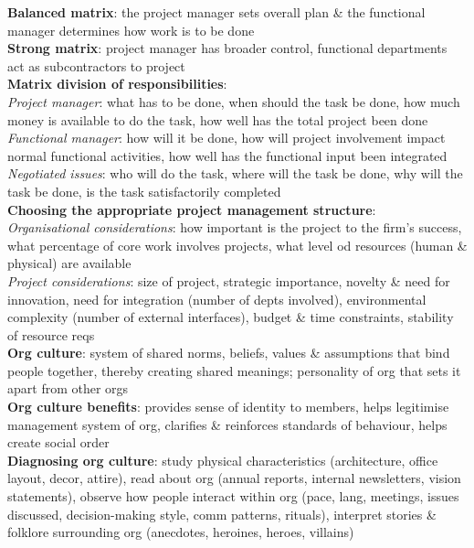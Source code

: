 \documentclass[a4paper]{article}
\begin{document}
\begin{multicols}{3}
        \textbf{Balanced matrix}: the project manager sets overall plan \& the functional manager determines how work is to be done\\
        \textbf{Strong matrix}: project manager has broader control, functional departments act as subcontractors to project\\
        \textbf{Matrix division of responsibilities}:\\
        \textit{Project manager}: what has to be done, when should the task be done, how much money is available to do the task, how well has the total project been done\\
        \textit{Functional manager}: how will it be done, how will project involvement impact normal functional activities, how well has the functional input been integrated\\
        \textit{Negotiated issues}: who will do the task, where will the task be done, why will the task be done, is the task satisfactorily completed\\
        \textbf{Choosing the appropriate project management structure}:\\
        \textit{Organisational considerations}: how important is the project to the firm's success, what percentage of core work involves projects, what level od resources (human \& physical) are available\\
        \textit{Project considerations}: size of project, strategic importance, novelty \& need for innovation, need for integration (number of depts involved), environmental complexity (number of external interfaces), budget \& time constraints, stability of resource reqs\\
        \textbf{Org culture}: system of shared norms, beliefs, values \& assumptions that bind people together, thereby creating shared meanings; personality of org that sets it apart from other orgs\\
        \textbf{Org culture benefits}: provides sense of identity to members, helps legitimise management system of org, clarifies \& reinforces standards of behaviour, helps create social order\\
        \textbf{Diagnosing org culture}: study physical characteristics (architecture, office layout, decor, attire), read about org (annual reports, internal newsletters, vision statements), observe how people interact within org (pace, lang, meetings, issues discussed, decision-making style, comm patterns, rituals), interpret stories \& folklore surrounding org (anecdotes, heroines, heroes, villains)\\

\end{multicols}
\end{document}
